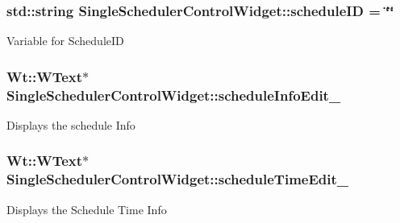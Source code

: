 \subsubsection[{\texorpdfstring{schedule\+ID}{scheduleID}}]{\setlength{\rightskip}{0pt plus 5cm}std\+::string Single\+Scheduler\+Control\+Widget\+::schedule\+ID = \char`\"{}\char`\"{}\hspace{0.3cm}{\ttfamily [private]}}\hypertarget{classSingleSchedulerControlWidget_a715d00f6515686a6df0a7e5a4b0ececd}{}\label{classSingleSchedulerControlWidget_a715d00f6515686a6df0a7e5a4b0ececd}
Variable for Schedule\+ID 
\subsubsection[{\texorpdfstring{schedule\+Info\+Edit\+\_\+}{scheduleInfoEdit_}}]{\setlength{\rightskip}{0pt plus 5cm}Wt\+::\+W\+Text$\ast$ Single\+Scheduler\+Control\+Widget\+::schedule\+Info\+Edit\+\_\+\hspace{0.3cm}{\ttfamily [private]}}\hypertarget{classSingleSchedulerControlWidget_a52857293e1ffa711d8e32c5905fca173}{}\label{classSingleSchedulerControlWidget_a52857293e1ffa711d8e32c5905fca173}
Displays the schedule Info 
\subsubsection[{\texorpdfstring{schedule\+Time\+Edit\+\_\+}{scheduleTimeEdit_}}]{\setlength{\rightskip}{0pt plus 5cm}Wt\+::\+W\+Text$\ast$ Single\+Scheduler\+Control\+Widget\+::schedule\+Time\+Edit\+\_\+\hspace{0.3cm}{\ttfamily [private]}}\hypertarget{classSingleSchedulerControlWidget_a7ec275b7a9811ca553e873fc12402c56}{}\label{classSingleSchedulerControlWidget_a7ec275b7a9811ca553e873fc12402c56}
Displays the Schedule Time Info 
